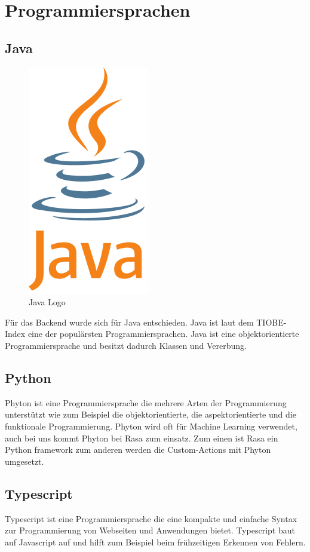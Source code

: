 \section{Programmiersprachen}

\subsection{Java}

\begin{figure}[hbt!]
    \centering
    \includegraphics[scale=0.5]{pics/java}
    \caption{Java Logo\cite{java}}
    \label{fig:impl:java}
\end{figure}

Für das Backend wurde sich für Java entschieden.
Java ist laut dem TIOBE-Index\cite{tiobe} eine der populärsten Programmiersprachen.
Java ist eine objektorientierte Programmiersprache und besitzt dadurch Klassen und Vererbung\cite{java}.

\subsection{Python}
Phyton ist eine Programmiersprache die mehrere Arten der Programmierung unterstützt wie zum Beispiel die objektorientierte, die aspektorientierte und die funktionale Programmierung.
Phyton wird oft für Machine Learning verwendet, auch bei uns kommt Phyton bei Rasa zum einsatz.
Zum einen ist Rasa ein Python framework zum anderen werden die Custom-Actions mit Phyton umgesetzt.

\subsection{Typescript}
Typescript ist eine Programmiersprache die eine kompakte und einfache Syntax zur Programmierung von Webseiten und Anwendungen bietet.
Typescript baut auf Javascript auf und hilft zum Beispiel beim frühzeitigen Erkennen von Fehlern.

